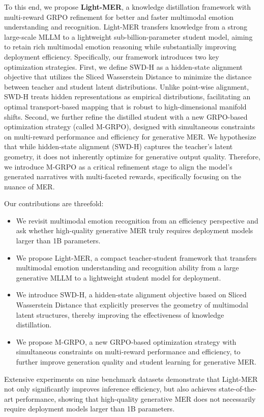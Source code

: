 \documentclass[sigconf]{acmart}
\begin{document}
To this end, we propose \textbf{Light-MER}, a knowledge distillation framework with multi-reward GRPO refinement for better and faster multimodal emotion understanding and recognition. Light-MER transfers knowledge from a strong large-scale MLLM to a lightweight sub-billion-parameter student model, aiming to retain rich multimodal emotion reasoning while substantially improving deployment efficiency. Specifically, our framework introduces two key optimization strategies. 
First, we define SWD-H as a hidden-state alignment objective that utilizes the Sliced Wasserstein Distance to minimize the distance between teacher and student latent distributions. Unlike point-wise alignment, SWD-H treats hidden representations as empirical distributions, facilitating an optimal transport-based mapping that is robust to high-dimensional manifold shifts.
Second, we further refine the distilled student with a new GRPO-based optimization strategy (called M-GRPO), designed with simultaneous constraints on multi-reward performance and efficiency for generative MER. 
We hypothesize that while hidden-state alignment (SWD-H) captures the teacher’s latent geometry, it does not inherently optimize for generative output quality. Therefore, we introduce M-GRPO as a critical refinement stage to align the model’s generated narratives with multi-faceted rewards, specifically focusing on the nuance of MER.


Our contributions are threefold:
\begin{itemize}
    \item We revisit multimodal emotion recognition from an efficiency perspective and ask whether high-quality generative MER truly requires deployment models larger than 1B parameters.
    \item We propose Light-MER, a compact teacher-student framework that transfers multimodal emotion understanding and recognition ability from a large generative MLLM to a lightweight student model for deployment. 
    \item We introduce SWD-H, a hidden-state alignment objective based on Sliced Wasserstein Distance that explicitly preserves the geometry of multimodal latent structures, thereby improving the effectiveness of knowledge distillation.
    \item We propose M-GRPO, a new GRPO-based optimization strategy with simultaneous constraints on multi-reward performance and efficiency, to further improve generation quality and student learning for generative MER.
\end{itemize}
Extensive experiments on nine benchmark datasets demonstrate that Light-MER not only significantly improves inference efficiency, but also achieves state-of-the-art performance, showing that high-quality generative MER does not necessarily require deployment models larger than 1B parameters.
\end{document}
